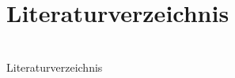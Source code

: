 \documentclass[hyperref={pdfpagemode=FullScreen, colorlinks=false}]{beamer}
\begin{document}

\section{Literaturverzeichnis}

\section{} %
\begin{frame}[allowframebreaks]{Literaturverzeichnis}
	\printbibliography
\end{frame}
\end{document}
